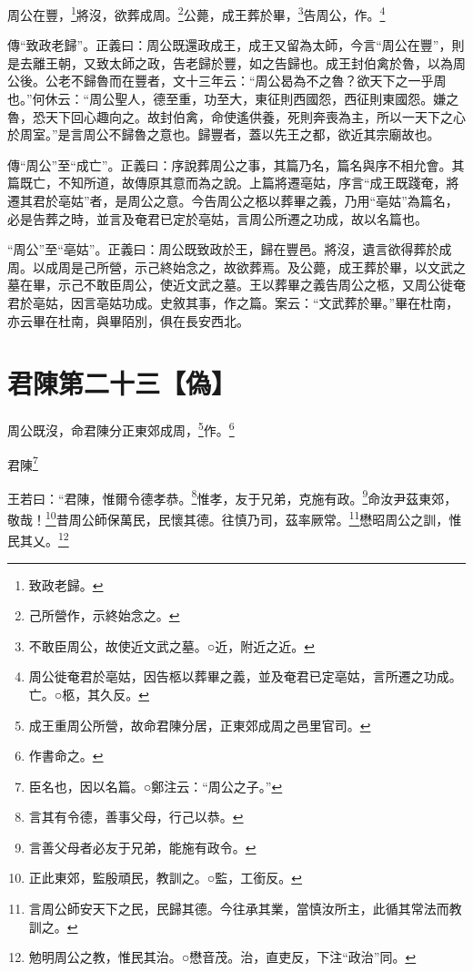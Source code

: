周公在豐，\footnote{致政老歸。}將沒，欲葬成周。\footnote{己所營作，示終始念之。}公薨，成王葬於畢，\footnote{不敢臣周公，故使近文武之墓。○近，附近之近。}告周公，作。\footnote{周公徙奄君於亳姑，因告柩以葬畢之義，並及奄君已定亳姑，言所遷之功成。亡。○柩，其久反。}


{\noindent\zhuan{}\fzbyks 傳“致政老歸”。正義曰：周公既還政成王，成王又留為太師，今言“周公在豐”，則是去離王朝，又致太師之政，告老歸於豐，如之告歸也。成王封伯禽於魯，以為周公後。公老不歸魯而在豐者，文十三年云：“周公曷為不之魯？欲天下之一乎周也。”何休云：“周公聖人，德至重，功至大，東征則西國怨，西征則東國怨。嫌之魯，恐天下回心趣向之。故封伯禽，命使遙供養，死則奔喪為主，所以一天下之心於周室。”是言周公不歸魯之意也。歸豐者，蓋以先王之都，欲近其宗廟故也。 \par}

{\noindent\zhuan{}\fzbyks 傳“周公”至“成亡”。正義曰：序說葬周公之事，其篇乃名，篇名與序不相允會。其篇既亡，不知所道，故傳原其意而為之說。上篇將遷亳姑，序言“成王既踐奄，將遷其君於亳姑”者，是周公之意。今告周公之柩以葬畢之義，乃用“亳姑”為篇名，必是告葬之時，並言及奄君已定於亳姑，言周公所遷之功成，故以名篇也。 \par}

{\noindent\shu{}\fzkt “周公”至“亳姑”。正義曰：周公既致政於王，歸在豐邑。將沒，遺言欲得葬於成周。以成周是己所營，示己終始念之，故欲葬焉。及公薨，成王葬於畢，以文武之墓在畢，示己不敢臣周公，使近文武之墓。王以葬畢之義告周公之柩，又周公徙奄君於亳姑，因言亳姑功成。史敘其事，作之篇。案云：“文武葬於畢。”畢在杜南，亦云畢在杜南，與畢陌別，俱在長安西北。 \par}

\section{君陳第二十三【偽】}


周公既沒，命君陳分正東郊成周，\footnote{成王重周公所營，故命君陳分居，正東郊成周之邑里官司。}作。\footnote{作書命之。}

君陳\footnote{臣名也，因以名篇。○鄭注云：“周公之子。”}

王若曰：“君陳，惟爾令德孝恭。\footnote{言其有令德，善事父母，行己以恭。}惟孝，友于兄弟，克施有政。\footnote{言善父母者必友于兄弟，能施有政令。}命汝尹茲東郊，敬哉！\footnote{正此東郊，監殷頑民，教訓之。○監，工銜反。}昔周公師保萬民，民懷其德。往慎乃司，茲率厥常。\footnote{言周公師安天下之民，民歸其德。今往承其業，當慎汝所主，此循其常法而教訓之。}懋昭周公之訓，惟民其乂。\footnote{勉明周公之教，惟民其治。○懋音茂。治，直吏反，下注“政治”同。}


